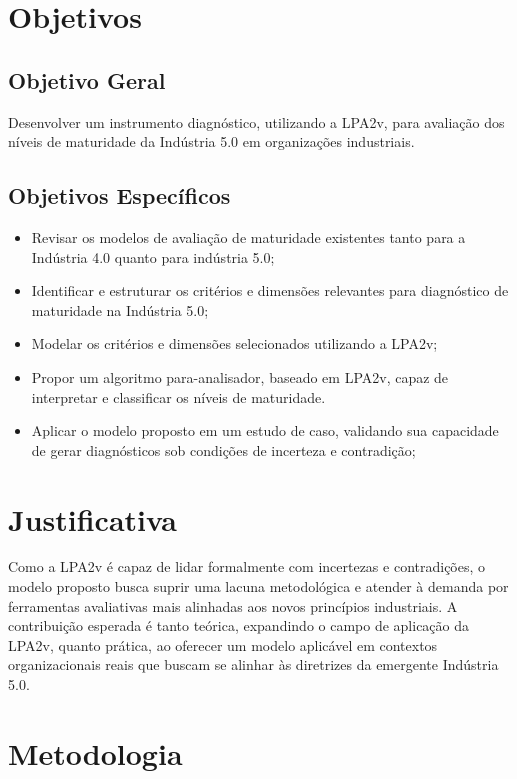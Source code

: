 \section{Objetivos}

\subsection{Objetivo Geral}

Desenvolver um instrumento diagnóstico, utilizando a \gls{LPA2v}, para avaliação dos níveis de maturidade da Indústria 5.0 em organizações industriais.

\subsection{Objetivos Específicos}

\begin{itemize}
  \item Revisar os modelos de avaliação de maturidade existentes tanto para a Indústria 4.0 quanto para indústria 5.0;
  \item Identificar e estruturar os critérios e dimensões relevantes para diagnóstico de maturidade na Indústria 5.0;
  \item Modelar os critérios e dimensões selecionados utilizando a \gls{LPA2v};
  \item Propor um algoritmo para-analisador, baseado em \gls{LPA2v}, capaz de interpretar e classificar os níveis de maturidade.
  \item Aplicar o modelo proposto em um estudo de caso, validando sua capacidade de gerar diagnósticos sob condições de incerteza e contradição;
\end{itemize}

\section{Justificativa}

Como a \gls{LPA2v} é capaz  de lidar formalmente com incertezas e contradições, o modelo proposto busca suprir uma lacuna metodológica e atender à demanda por ferramentas avaliativas mais alinhadas aos novos princípios industriais.
A contribuição esperada é tanto teórica, expandindo o campo de aplicação da \gls{LPA2v}, quanto prática, ao oferecer um modelo aplicável em contextos organizacionais reais que buscam se alinhar às diretrizes da emergente Indústria 5.0.

\section{Metodologia}


